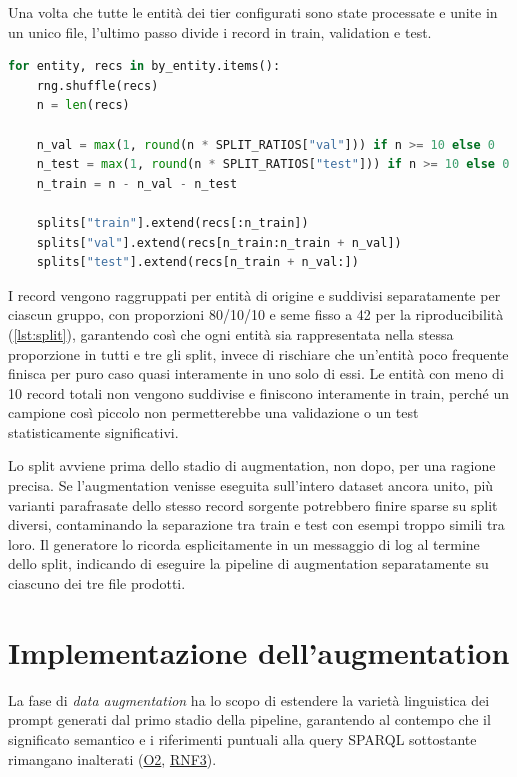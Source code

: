 \documentclass[12pt,a4paper,openright,twoside]{book}
\begin{document}
Una volta che tutte le entità dei tier configurati sono state processate e unite
in un unico file, l'ultimo passo divide i record in train, validation e test.

\begin{lstlisting}[language=Python, caption={Suddivisione del dataset in train, validation e test, stratificata per entità di origine.}, label={lst:split}]
for entity, recs in by_entity.items():
    rng.shuffle(recs)
    n = len(recs)
    
    n_val = max(1, round(n * SPLIT_RATIOS["val"])) if n >= 10 else 0
    n_test = max(1, round(n * SPLIT_RATIOS["test"])) if n >= 10 else 0
    n_train = n - n_val - n_test
    
    splits["train"].extend(recs[:n_train])
    splits["val"].extend(recs[n_train:n_train + n_val])
    splits["test"].extend(recs[n_train + n_val:])
\end{lstlisting}

I record vengono raggruppati per entità di origine e suddivisi separatamente per
ciascun gruppo, con proporzioni 80/10/10 e seme fisso a 42 per la
riproducibilità (\cref{lst:split}), garantendo così che ogni entità sia
rappresentata nella stessa proporzione in tutti e tre gli split, invece di
rischiare che un'entità poco frequente finisca per puro caso quasi interamente
in uno solo di essi. Le entità con meno di 10 record totali non vengono
suddivise e finiscono interamente in train, perché un campione così piccolo non
permetterebbe una validazione o un test statisticamente significativi.

Lo split avviene prima dello stadio di augmentation, non dopo, per una ragione
precisa. Se l'augmentation venisse eseguita sull'intero dataset ancora unito,
più varianti parafrasate dello stesso record sorgente potrebbero finire sparse
su split diversi, contaminando la separazione tra train e test con esempi troppo
simili tra loro. Il generatore lo ricorda esplicitamente in un messaggio di log
al termine dello split, indicando di eseguire la pipeline di augmentation
separatamente su ciascuno dei tre file prodotti.

\section{Implementazione dell'augmentation}
\label{sec:impl-augmentation}

La fase di \textit{data augmentation} ha lo scopo di estendere la varietà
linguistica dei prompt generati dal primo stadio della pipeline, garantendo al
contempo che il significato semantico e i riferimenti puntuali alla query SPARQL
sottostante rimangano inalterati (\hyperref[obj:O2]{O2},
\hyperref[rnf:RNF3]{RNF3}).
\end{document}
